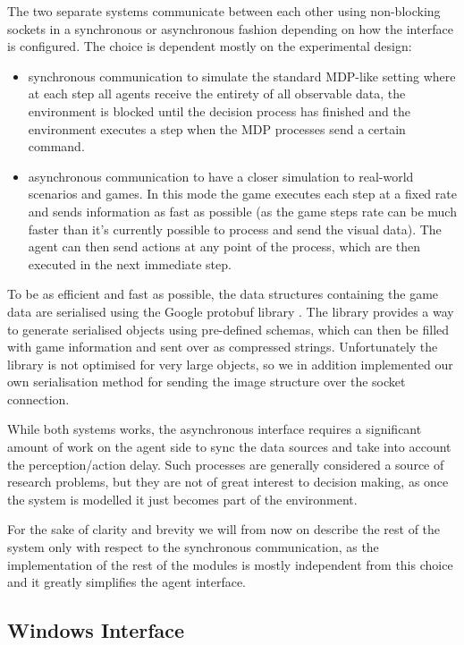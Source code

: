 The two separate systems communicate between each other using non-blocking
sockets in a synchronous or asynchronous fashion depending on how the interface
is configured. The choice is dependent mostly on the experimental design:

\begin{itemize}
\item synchronous communication to simulate the standard MDP-like setting where
  at each step all agents receive the entirety of all observable data, the
  environment is blocked until the decision process has finished and the
  environment executes a step when the MDP processes send a certain command. 
\item asynchronous communication to have a closer simulation to real-world
  scenarios and games. In this mode the game executes each step at a fixed rate
  and sends information as fast as possible (as the game steps rate can be much
  faster than it's currently possible to process and send the visual data). The
  agent can then send actions at any point of the process, which are then
  executed in the next immediate step.
\end{itemize}

To be as efficient and fast as possible, the data structures containing the game
data are serialised using the Google protobuf library \citep{varda2008protocol}.
The library provides a way to generate serialised objects using pre-defined
schemas, which can then be filled with game information and sent over as
compressed strings. Unfortunately the library is not optimised for very large
objects, so we in addition implemented our own serialisation method for
sending the image structure over the socket connection.

While both systems works, the asynchronous interface requires a significant
amount of work on the agent side to sync the data sources and take into account
the perception/action delay. Such processes are generally considered a source of
research problems, but they are not of great interest to decision making, as
once the system is modelled it just becomes part of the environment.

For the sake of clarity and brevity we will from now on describe the rest of the
system only with respect to the synchronous communication, as the implementation
of the rest of the modules is mostly independent from this choice and it greatly
simplifies the agent interface.

\subsection{Windows Interface}

